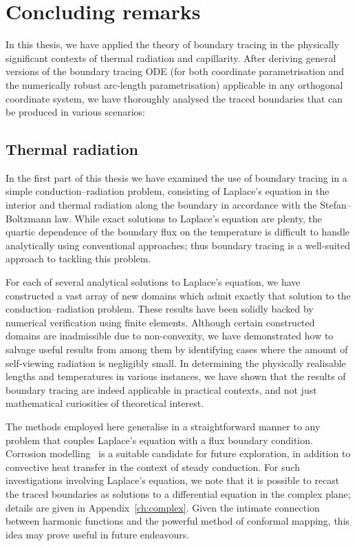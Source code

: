 \chapter{Concluding remarks}
\label{ch:concluding}

In this thesis,
we have applied the theory of boundary tracing
in the physically significant contexts
of thermal radiation and capillarity.
After deriving general versions of the boundary tracing ODE
(for both coordinate parametrisation
and the numerically robust arc-length parametrisation)
applicable in any orthogonal coordinate system,
we have thoroughly analysed
the traced boundaries that can be produced in various scenarios:

\section{Thermal radiation}
\label{sec:concluding.radiation}

In the first part of this thesis we have examined the use of boundary tracing
in a simple conduction--radiation problem,
consisting of Laplace's equation in the interior
and thermal radiation along the boundary
in accordance with the Stefan--Boltzmann law.
While exact solutions to Laplace's equation are plenty,
the quartic dependence of the boundary flux on the temperature
is difficult to handle analytically using conventional approaches;
thus boundary tracing is a well-suited approach to tackling this problem.

For each of several analytical solutions to Laplace's equation,
we have constructed a vast array of new domains
which admit exactly that solution
to the conduction--radiation problem.
These results have been solidly backed
by numerical verification using finite elements.
Although certain constructed domains are inadmissible
due to non-convexity,
we have demonstrated how to salvage useful results from among them
by identifying cases
where the amount of self-viewing radiation is negligibly small.
In determining the physically realisable lengths and temperatures
in various instances,
we have shown that the results of boundary tracing
are indeed applicable in practical contexts,
and not just mathematical curiosities of theoretical interest.

\thematicbreak

The methods employed here
generalise in a straightforward manner
to any problem
that couples Laplace's equation with a flux boundary condition.
Corrosion modelling~\cite{
  bryan-2002-singular-nonlinear-elliptic-corrosion,
  vogelius-1998-nonlinear-elliptic-bvp-corrosion
}
is a suitable candidate for future exploration,
in addition to convective heat transfer
in the context of steady conduction.
For such investigations involving Laplace's equation,
we note that it is possible to recast the traced boundaries
as solutions to a differential equation in the complex plane;
details are given in Appendix~\ref{ch:complex}\@.
Given the intimate connection between
harmonic functions and the powerful method of conformal mapping,
this idea may prove useful in future endeavours.

